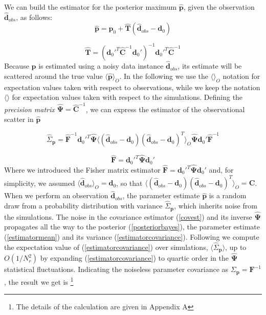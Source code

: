 \documentclass[reprint,aps,prd,superscriptaddress,showkeys,showpacs]{revtex4-1}
\newcommand{\bb}[1]{\mathbf{#1}}
\newcommand{\bbh}[1]{\mathbf{\hat{#1}}}
\newcommand{\h}[1]{\hat{#1}}
\begin{document}
We can build the estimator for the posterior maximum $\bbh{p}$, given the observation $\bbh{d}_{obs}$, as follows:
%
\begin{equation}
\label{estimatormean}
\bbh{p} = \bb{p}_0 + \bbh{T}(\bbh{d}_{obs}-\bb{d}_0)
\end{equation}

\begin{equation}
\bbh{T} = (\bb{d}_0'^T\bbh{C}^{-1}\bb{d}_0')^{-1}\bb{d}_0'^T\bbh{C}^{-1}
\end{equation}
%
Because $\bbh{p}$ is estimated using a noisy data instance $\bbh{d}_{obs}$, its estimate will be scattered around the true value $\langle\bbh{p}\rangle_O$. In the following we use the $\langle\rangle_O$ notation for expectation values taken with respect to observations, while we keep the notation $\langle\rangle$ for expectation values taken with respect to the simulations. Defining the \textit{precision matrix} $\bbh{\Psi}=\bbh{C}^{-1}$, we can express the estimator of the observational scatter in $\bbh{p}$

\begin{equation}
\label{estimatorcovariance}
\h{\Sigma}_\bb{p} = \bbh{F}^{-1}\bb{d}_0'^T\bbh{\Psi}\langle(\bbh{d}_{obs}-\bb{d}_0)(\bbh{d}_{obs}-\bb{d}_0)^T\rangle_O\bbh{\Psi}\bb{d}_0'\bbh{F}^{-1}
\end{equation}

\begin{equation}
\label{estimatorfisher}
\bbh{F} = \bb{d}_0'^T\bbh{\Psi}\bb{d}_0'
\end{equation}
%
Where we introduced the Fisher matrix estimator $\bbh{F} = \bb{d}_0'^T\bbh{\Psi}\bb{d}_0'$ and, for simplicity, we assumed $\langle\bbh{d}_{obs}\rangle_O=\bb{d}_0$, so that $\langle(\bbh{d}_{obs}-\bb{d}_0)(\bbh{d}_{obs}-\bb{d}_0)^T\rangle_O=\bb{C}$. 
When we perform an observation $\bbh{d}_{obs}$, the parameter estimate $\bbh{p}$ is a random draw from a probability distribution with variance $\h{\Sigma}_\bb{p}$, which inherits noise from the simulations. The noise in the covariance estimator (\ref{covest}) and its inverse $\bbh{\Psi}$ propagates all the way to the posterior (\ref{posteriorbayes}), the parameter estimate (\ref{estimatormean}) and its variance (\ref{estimatorcovariance}). Following \citep{DodelsonSchneider13,Taylor12,MasumotoWishart} we compute the expectation value of (\ref{estimatorcovariance}) over simulations, $\langle\h{\Sigma}_\bb{p}\rangle$, up to $O(1/N_r^2)$ by expanding (\ref{estimatorcovariance}) to quartic order in the $\bbh{\Psi}$ statistical fluctuations. Indicating the noiseless parameter covariance as $\Sigma_\bb{p}=\bb{F}^{-1}$, the result we get is \footnote{The details of the calculation are given in Appendix A}  
\end{document}
